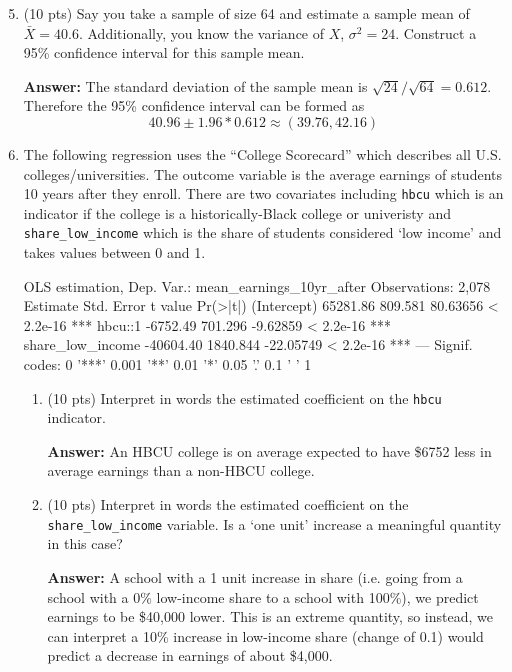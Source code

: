 \documentclass[12pt]{article}
\newcommand{\answer}[1]{{\color{blue_winged_teal}\textbf{Answer:} #1}}
\newcommand{\pts}[1]{{\color{zinc500}(#1 pts)}}
\begin{document}
\newpage
\begin{enumerate}
  \setcounter{enumi}{4}
  \item \pts{10} Say you take a sample of size 64 and estimate a sample mean of $\bar{X} = 40.6$. Additionally, you know the variance of $X$, $\sigma^2 = 24$. Construct a 95\% confidence interval for this sample mean. 
  
  \answer{
    The standard deviation of the sample mean is $\sqrt{24}/\sqrt{64} = 0.612$. Therefore the 95\% confidence interval can be formed as 
    $$
      40.96 \pm 1.96 * 0.612 \approx (39.76, 42.16)
    $$
  }

  \bigskip
  \item The following regression uses the ``College Scorecard'' which describes all U.S. colleges/universities. The outcome variable is the average earnings of students 10 years after they enroll. There are two covariates including \texttt{hbcu} which is an indicator if the college is a historically-Black college or univeristy and \texttt{share\_low\_income} which is the share of students considered `low income' and takes values between 0 and 1.
  \begin{codeblock}[{}]
OLS estimation, Dep. Var.: mean_earnings_10yr_after
Observations: 2,078
                  Estimate Std. Error   t value  Pr(>|t|)    
(Intercept)       65281.86    809.581  80.63656 < 2.2e-16 ***
hbcu::1           -6752.49    701.296  -9.62859 < 2.2e-16 ***
share_low_income -40604.40   1840.844 -22.05749 < 2.2e-16 ***
---
Signif. codes:  0 '***' 0.001 '**' 0.01 '*' 0.05 '.' 0.1 ' ' 1
  \end{codeblock}

  \begin{enumerate}[leftmargin = 2em]
    \item \pts{10} Interpret in words the estimated coefficient on the \texttt{hbcu} indicator. 
    
    \answer{
      An HBCU college is on average expected to have \$6752 less in average earnings than a non-HBCU college.
    }

    \item \pts{10} Interpret in words the estimated coefficient on the \texttt{share\_low\_income} variable. Is a `one unit' increase a meaningful quantity in this case?
    
    \answer{
      A school with a 1 unit increase in share (i.e. going from a school with a 0\% low-income share to a school with 100\%), we predict earnings to be \$40,000 lower. This is an extreme quantity, so instead, we can interpret a 10\% increase in low-income share (change of 0.1) would predict a decrease in earnings of about \$4,000.
    }
  \end{enumerate}
\end{enumerate}
\end{document}
